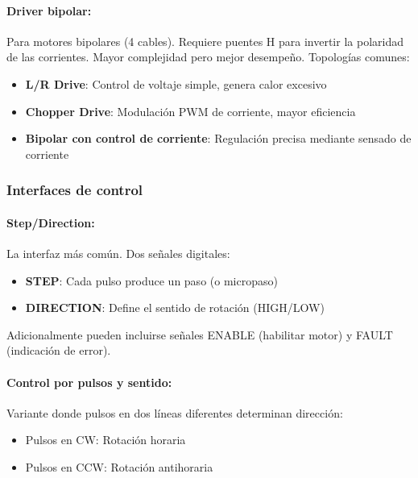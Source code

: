 \paragraph{Driver bipolar:}

Para motores bipolares (4 cables). Requiere puentes H para invertir la polaridad de las corrientes. Mayor complejidad pero mejor desempeño. Topologías comunes:

\begin{itemize}
    \item \textbf{L/R Drive}: Control de voltaje simple, genera calor excesivo
    \item \textbf{Chopper Drive}: Modulación PWM de corriente, mayor eficiencia
    \item \textbf{Bipolar con control de corriente}: Regulación precisa mediante sensado de corriente
\end{itemize}

\subsubsection{Interfaces de control}

\paragraph{Step/Direction:}

La interfaz más común. Dos señales digitales:
\begin{itemize}
    \item \textbf{STEP}: Cada pulso produce un paso (o micropaso)
    \item \textbf{DIRECTION}: Define el sentido de rotación (HIGH/LOW)
\end{itemize}

Adicionalmente pueden incluirse señales ENABLE (habilitar motor) y FAULT (indicación de error).

\paragraph{Control por pulsos y sentido:}

Variante donde pulsos en dos líneas diferentes determinan dirección:
\begin{itemize}
    \item Pulsos en CW: Rotación horaria
    \item Pulsos en CCW: Rotación antihoraria
\end{itemize}

